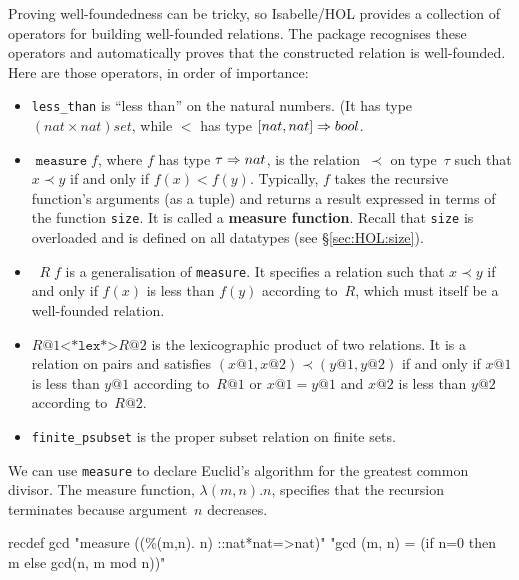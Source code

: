 Proving well-foundedness can be tricky, so Isabelle/HOL provides a collection
of operators for building well-founded relations.  The package recognises
these operators and automatically proves that the constructed relation is
well-founded.  Here are those operators, in order of importance:
\begin{itemize}
\item \texttt{less_than} is ``less than'' on the natural numbers.
  (It has type $(nat\times nat)set$, while $<$ has type $[nat,nat]\Rightarrow bool$.
  
\item $\mathop{\mathtt{measure}} f$, where $f$ has type $\tau\Rightarrow nat$, is the
  relation~$\prec$ on type~$\tau$ such that $x\prec y$ if and only if
  $f(x)<f(y)$.  
  Typically, $f$ takes the recursive function's arguments (as a tuple) and
  returns a result expressed in terms of the function \texttt{size}.  It is
  called a \textbf{measure function}.  Recall that \texttt{size} is overloaded
  and is defined on all datatypes (see {\S}\ref{sec:HOL:size}).
                                                    
\item $\mathop{\mathtt{inv_image}} R\;f$ is a generalisation of
  \texttt{measure}.  It specifies a relation such that $x\prec y$ if and only
  if $f(x)$ 
  is less than $f(y)$ according to~$R$, which must itself be a well-founded
  relation.

\item $R@1\texttt{<*lex*>}R@2$ is the lexicographic product of two relations.
  It 
  is a relation on pairs and satisfies $(x@1,x@2)\prec(y@1,y@2)$ if and only
  if $x@1$ 
  is less than $y@1$ according to~$R@1$ or $x@1=y@1$ and $x@2$
  is less than $y@2$ according to~$R@2$.

\item \texttt{finite_psubset} is the proper subset relation on finite sets.
\end{itemize}

We can use \texttt{measure} to declare Euclid's algorithm for the greatest
common divisor.  The measure function, $\lambda(m,n). n$, specifies that the
recursion terminates because argument~$n$ decreases.
\begin{ttbox}
recdef gcd "measure ((\%(m,n). n) ::nat*nat=>nat)"
    "gcd (m, n) = (if n=0 then m else gcd(n, m mod n))"
\end{ttbox}

